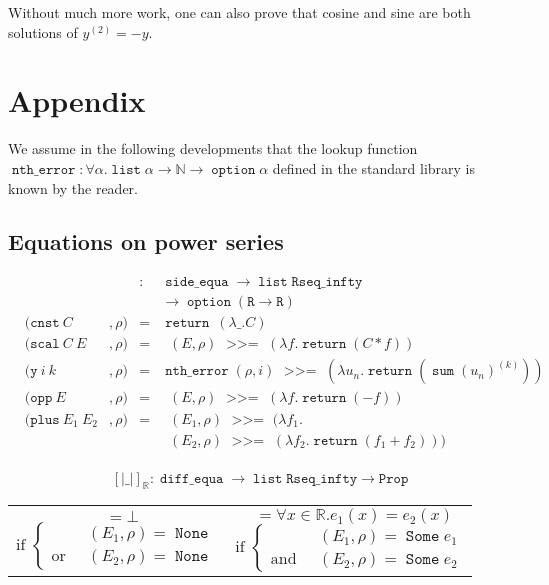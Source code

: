 \documentclass{article}
\newcommand{\Prop}{\texttt{Prop}}
\newcommand{\N}{\mathbb{N}}
\newcommand{\R}{\mathbb{R}}
\DeclareMathOperator{\None}{\mathtt{None}}
\DeclareMathOperator{\Some}{\mathtt{Some}}
\DeclareMathOperator{\return}{\mathtt{return}}
\DeclareMathOperator{\bind}{~\mathtt{>>=}~}
\DeclareMathOperator{\ntherr}{\mathtt{nth\_error}}
\DeclareMathOperator{\option}{\mathtt{option}}
\DeclareMathOperator{\alist}{\mathtt{list}}
\DeclareMathOperator{\de}{\mathtt{diff\_equa}}
\DeclareMathOperator{\se}{\mathtt{side\_equa}}
\DeclareMathOperator{\Interp}{\mathtt{interp}}
\DeclareMathOperator{\Sem}{\left[\left| E_1 :=: E_2 \right|\right]}
\DeclareMathOperator{\SemR}{\Sem_{\R} \rho}
\DeclareMathOperator{\IR}{\Interp_{\R}}
\DeclareMathOperator{\Psum}{\mathtt{sum}}
\begin{document}
Without much more work, one can also prove that cosine and sine are
both solutions of $y^{(2)} = - y$.

\printbibliography{}
\newpage{}

\section{Appendix}

We assume in the following developments that the lookup function
$\ntherr : \forall \alpha. \alist{} \alpha \rightarrow \N \rightarrow \option{}
\alpha$ defined in the standard library is known by the reader.

\subsection{Equations on power series}

\label{interpR}

$$\begin{array}{lllcl}
\IR & & & : & \se \rightarrow \alist{} \mathtt{Rseq\_infty} \\
    & & &   & \rightarrow \option{} (\texttt{R} \rightarrow \texttt{R}) \\
\IR & (\mathtt{cnst}~ C & , \rho) & = & \return~ (\lambda \_.C)\\
\IR & (\mathtt{scal}~ C ~ E &, \rho) & = & \IR(E, \rho) \bind (\lambda f. \return (C * f))\\
\IR & (\mathtt{y} ~ i ~ k &, \rho) & = & \ntherr(\rho, i) \bind (\lambda u_n. \return (\Psum{}(u_n)^{(k)})) \\
\IR & (\mathtt{opp} ~E &, \rho) & = & \IR(E,\rho) \bind (\lambda f. \return (- f))\\
\IR & (\mathtt{plus} ~ E_1 ~ E_2 &, \rho) & = & \IR(E_1,\rho) \bind (\lambda f_1.\\
    & & &   & \IR(E_2,\rho) \bind (\lambda f_2. \return (f_1 + f_2)))\\
\end{array}$$


$$\left[\left| \_ \right|\right]_{\R} : \de \rightarrow \alist{}
\mathtt{Rseq\_infty} \rightarrow \Prop$$

\begin{center}
\begin{tabular}{c|c}
\begin{minipage}{0.45\textwidth}
$$\SemR{} = \bot$$
$$ \text{if } \left\lbrace
\begin{array}{ll}
& \IR(E_1, \rho) = \None\\
\text{or} & \IR(E_2, \rho) = \None
\end{array}\right.$$
\end{minipage}

& \begin{minipage}{0.45\textwidth}
$$\SemR{} = \forall x \in \R. e_1(x) = e_2(x)$$
$$\text{if } \left\lbrace
\begin{array}{ll}
& \IR(E_1, \rho) = \Some e_1\\
\text{and} & \IR(E_2, \rho) = \Some e_2
\end{array}\right.$$
\end{minipage}

\end{tabular}
\end{center}
\end{document}
